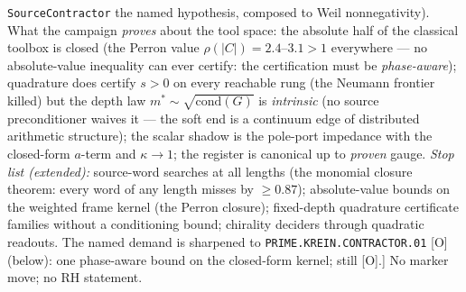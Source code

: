 \documentclass[11pt,a4paper]{article}
\begin{document}
{\texttt{SourceContractor} the named hypothesis, composed to
Weil nonnegativity).  What the campaign \emph{proves} about the
tool space: the absolute half of the classical toolbox is
closed (the Perron value $\rho(|C|) = 2.4$--$3.1 > 1$
everywhere --- no absolute-value inequality can ever certify:
the certification must be \emph{phase-aware}); quadrature does
certify $s > 0$ on every reachable rung (the Neumann frontier
killed) but the depth law $m^* \sim \sqrt{\mathrm{cond}(G)}$ is
\emph{intrinsic} (no source preconditioner waives it --- the
soft end is a continuum edge of distributed arithmetic
structure); the scalar shadow is the pole-port impedance with
the closed-form $a$-term and $\kappa \to 1$; the register is
canonical up to \emph{proven} gauge.  \emph{Stop list
(extended):} source-word searches at all lengths (the monomial
closure theorem: every word of any length misses by
$\ge 0.87$); absolute-value bounds on the weighted frame kernel
(the Perron closure); fixed-depth quadrature certificate
families without a conditioning bound; chirality deciders
through quadratic readouts.  The named demand is sharpened to
\texttt{PRIME.KREIN.CONTRACTOR.01} [O] (below): one phase-aware
bound on the closed-form kernel; still [O].]
No marker move; no RH statement.\par}
\end{document}
